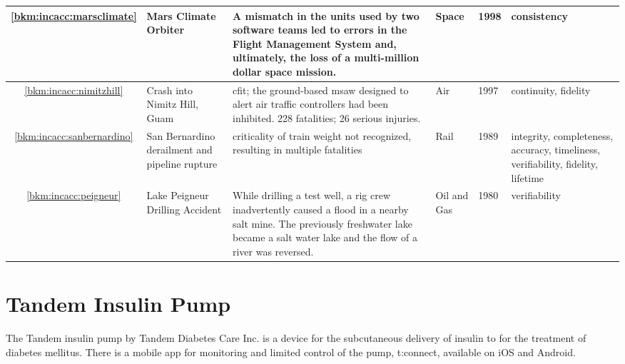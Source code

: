 \begin{longtable}{|C{}|L{}|L{}|L{}|L{}|L{}|}
	\hline
	\ref{bkm:incacc:marsclimate} & Mars Climate Orbiter & A mismatch in the units used by two software teams led to errors in the Flight Management System and, ultimately, the loss of a multi-million dollar space mission. & Space & 1998 & \Gls{consistency} \\
	\hline
	\ref{bkm:incacc:nimitzhill} & Crash into Nimitz Hill, Guam & \Gls{cfit}; the ground-based \gls{msaw} designed to alert air traffic controllers had been inhibited. 228 fatalities; 26 serious injuries. & Air & 1997 & \Gls{continuity}, \gls{fidelity}\\
	\hline
        \ref{bkm:incacc:sanbernardino} &
        San Bernardino  derailment and pipeline rupture & \Gls{criticality} of train weight not recognized,
        resulting in multiple fatalities &
        Rail & 1989 & \Gls{integrity}, \gls{completeness}, \gls{accuracy}, \gls{timeliness}, \gls{verifiability}, \gls{fidelity}, \gls{lifetime} \\
        \hline
	\ref{bkm:incacc:peigneur} & Lake Peigneur Drilling Accident & While drilling a test well, a rig crew inadvertently caused a flood in a nearby salt mine. The previously freshwater lake became a salt water lake and the flow of a river was reversed. & Oil and Gas & 1980 & \Gls{verifiability} \\
	\hline

\end{longtable}

\section{Tandem Insulin Pump}\label{bkm:inacc:tandem}
The Tandem insulin pump by Tandem Diabetes Care Inc. is a device for the subcutaneous delivery of insulin to for the treatment of diabetes mellitus. There is a mobile app for monitoring and limited control of the pump, t:connect,  available on iOS and Android.

